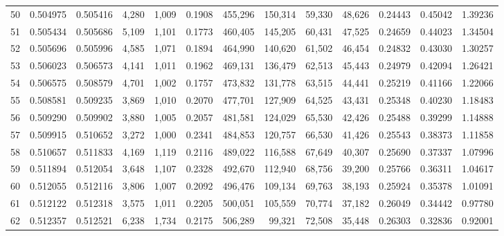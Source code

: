 \begin{tabular}{rrrrrrrrrrrrr}
50 &  0.504975 &  0.505416 &   4,280 &  1,009 &                                     0.1908 &  455,296 &  150,314 &   59,330 &   48,626 &  0.24443 &  0.45042 &  1.39236 \\
51 &  0.505434 &  0.505686 &   5,109 &  1,101 &                                     0.1773 &  460,405 &  145,205 &   60,431 &   47,525 &  0.24659 &  0.44023 &  1.34504 \\
52 &  0.505696 &  0.505996 &   4,585 &  1,071 &                                     0.1894 &  464,990 &  140,620 &   61,502 &   46,454 &  0.24832 &  0.43030 &  1.30257 \\
53 &  0.506023 &  0.506573 &   4,141 &  1,011 &                                     0.1962 &  469,131 &  136,479 &   62,513 &   45,443 &  0.24979 &  0.42094 &  1.26421 \\
54 &  0.506575 &  0.508579 &   4,701 &  1,002 &                                     0.1757 &  473,832 &  131,778 &   63,515 &   44,441 &  0.25219 &  0.41166 &  1.22066 \\
55 &  0.508581 &  0.509235 &   3,869 &  1,010 &                                     0.2070 &  477,701 &  127,909 &   64,525 &   43,431 &  0.25348 &  0.40230 &  1.18483 \\
56 &  0.509290 &  0.509902 &   3,880 &  1,005 &                                     0.2057 &  481,581 &  124,029 &   65,530 &   42,426 &  0.25488 &  0.39299 &  1.14888 \\
57 &  0.509915 &  0.510652 &   3,272 &  1,000 &                                     0.2341 &  484,853 &  120,757 &   66,530 &   41,426 &  0.25543 &  0.38373 &  1.11858 \\
58 &  0.510657 &  0.511833 &   4,169 &  1,119 &                                     0.2116 &  489,022 &  116,588 &   67,649 &   40,307 &  0.25690 &  0.37337 &  1.07996 \\
59 &  0.511894 &  0.512054 &   3,648 &  1,107 &                                     0.2328 &  492,670 &  112,940 &   68,756 &   39,200 &  0.25766 &  0.36311 &  1.04617 \\
60 &  0.512055 &  0.512116 &   3,806 &  1,007 &                                     0.2092 &  496,476 &  109,134 &   69,763 &   38,193 &  0.25924 &  0.35378 &  1.01091 \\
61 &  0.512122 &  0.512318 &   3,575 &  1,011 &                                     0.2205 &  500,051 &  105,559 &   70,774 &   37,182 &  0.26049 &  0.34442 &  0.97780 \\
62 &  0.512357 &  0.512521 &   6,238 &  1,734 &                                     0.2175 &  506,289 &   99,321 &   72,508 &   35,448 &  0.26303 &  0.32836 &  0.92001 \\

\end{tabular}
